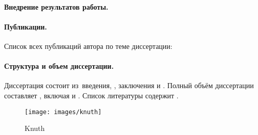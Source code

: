 \paragraph*{Внедрение результатов работы.}

\paragraph*{Публикации.} Список всех публикаций автора по теме диссертации:

\begin{refsection}
\nocite{*}
\printbibliography[
    keyword=own,
    heading=none,
    resetnumbers=true
]
\end{refsection}



\paragraph*{Структура и объем диссертации. }
Диссертация состоит из~введения,
,
заключения и
.
%
Полный объём диссертации составляет
, включая
 и
.
Список литературы содержит
.


\begin{figure}
    \centering
    \texttt{[image: images/knuth]}
    \caption{Knuth}
    \label{fig:my_label}
\end{figure}